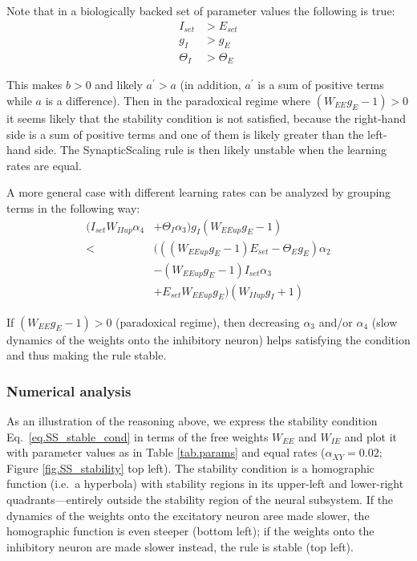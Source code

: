 \documentclass[
twocolumn,
]{article}
\newcommand{\EE}{\mathit{EE}}
\newcommand{\IE}{\mathit{IE}}
\newcommand{\II}{\mathit{II}}
\newcommand{\XY}{\mathit{XY}}
\newcommand{\set}{\mathit{set}}
\newcommand{\up}{\mathit{up}}
\begin{document}
\noindent Note that in a biologically backed set of parameter values the following is true:
\begin{displaymath}
\begin{aligned}
I_{\set} & > E_{\set} \\
g_I & > g_E \\
\Theta_I & > \Theta_E
\end{aligned}
\end{displaymath}

\noindent This makes $b>0$ and likely $a^\prime>a$ (in addition, $a^\prime$ is a sum of positive terms while $a$ is a difference). Then in the paradoxical regime where $(W_{\EE}g_E - 1)>0$ it seems likely that the stability condition is not satisfied, because the right-hand side is a sum of positive terms and one of them is likely greater than the left-hand side. The SynapticScaling rule is then likely unstable when the learning rates are equal.

A more general case with different learning rates can be analyzed by grouping terms in the following way:
\begin{displaymath}
\begin{aligned}
(I_{\set} W_{\II\up} \alpha_4 & + \Theta_I\alpha_3) g_I(W_{\EE\up} g_E - 1) \\
< & (((W_{\EE\up} g_E - 1) E_{\set} - \Theta_E g_E)\alpha_2 \\
& -(W_{\EE\up} g_E - 1) I_{\set}\alpha_3 \\
& + E_{\set} W_{\EE\up} g_E) (W_{\II\up} g_I + 1)
\end{aligned}
\end{displaymath}

\noindent If $(W_{EE}g_E - 1) > 0$ (paradoxical regime), then decreasing $\alpha_3$ and/or $\alpha_4$ (slow dynamics of the weights onto the inhibitory neuron) helps satisfying the condition and thus making the rule stable.




\subsubsection{Numerical analysis}

As an illustration of the reasoning above, we express the stability condition Eq.\ \ref{eq.SS_stable_cond} in terms of the free weights $W_{\EE}$ and $W_{\IE}$ and plot it  with parameter values as in Table \ref{tab.params} and equal rates ($\alpha_{\XY}=0.02$; Figure \ref{fig.SS_stability} top left). The stability condition is a homographic function (i.e.\ a hyperbola) with stability regions in its upper-left and lower-right quadrants---entirely outside the stability region of the neural subsystem. If the dynamics of the weights onto the excitatory neuron aree made slower, the homographic function is even steeper (bottom left); if the weights onto the inhibitory neuron are made slower instead, the rule is stable (top left).
\end{document}
